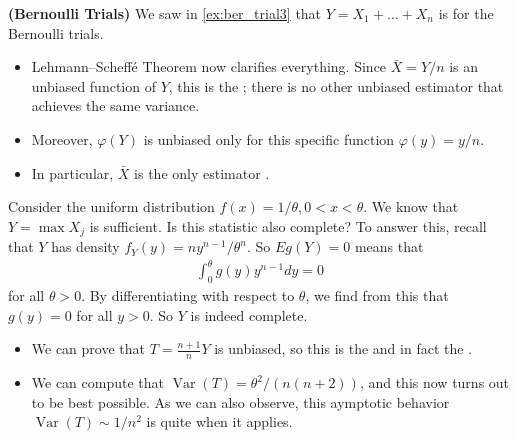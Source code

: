 \documentclass{article}
\newcommand{\bfs}[1]{\textbf{({#1}) }}
\begin{document}
\begin{exma}\bfs{Bernoulli Trials}\label{ex:ber_trial4}
  We saw in \cref{ex:ber_trial3} that $Y=X_{1}+\ldots+X_{n}$ is  for the Bernoulli trials.
  \begin{itemize}
      \item {Lehmann–Scheff\'e Theorem} now clarifies everything. Since $\bar{X}=Y / n$ is an unbiased function of $Y$, this is the ; there is no other unbiased estimator that achieves the same variance.
      \item  Moreover, $\varphi(Y)$ is unbiased only for this specific function $\varphi(y)=y / n$.
      \item In particular, $\bar{X}$ is the only  estimator \cite[Chapter 3.]{mitnotes}. 
  \end{itemize} 
  \end{exma}
\begin{exma}
  Consider the uniform distribution $f(x)=1 / \theta, 0<x<\theta$. We know that $Y=\max X_{j}$ is sufficient. Is this statistic also complete? To answer this, recall that $Y$ has density $f_{Y}(y)=n y^{n-1} / \theta^{n}$. So $E g(Y)=0$ means that
\begin{align*}
\int_{0}^{\theta} g(y) y^{n-1} d y=0
\end{align*}
for all $\theta>0$. By differentiating with respect to $\theta$, we find from this that $g(y)=0$ for all $y>0$. So $Y$ is indeed complete.

\begin{itemize}
    \item We can prove that $T=\frac{n+1}{n} Y$ is unbiased, so this is the  and in fact the .
    \item We can compute that $\operatorname{Var}(T)=\theta^{2} /(n(n+2))$, and this now turns out to be best possible. As we can also observe, this aymptotic behavior $\operatorname{Var}(T) \sim 1 / n^{2}$ is quite  when it applies.
\end{itemize} 
\end{exma} 
\end{document}
